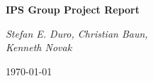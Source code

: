 \begin{titlepage}
	\centering
	{\huge\bfseries IPS Group Project Report\par}
	\vspace{2cm}
	{\Large\itshape Stefan E. Duro, Christian Baun,\\ Kenneth Novak\par}
	\vfill
	{\large \today\par}
\end{titlepage}
